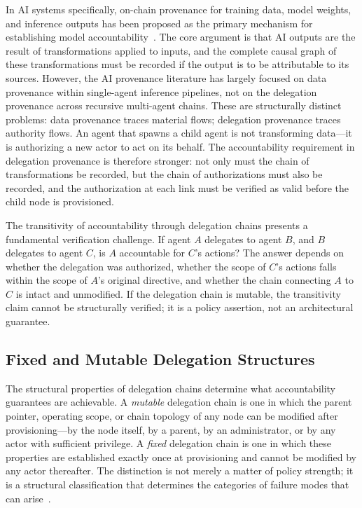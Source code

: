 In AI systems specifically, on-chain provenance for training data, model weights, and inference outputs has been proposed as the primary mechanism for establishing model accountability~\cite{ accountable_ai_dag}. The core argument is that AI outputs are the result of transformations applied to inputs, and the complete causal graph of these transformations must be recorded if the output is to be attributable to its sources. However, the AI provenance literature has largely focused on data provenance within single-agent inference pipelines, not on the delegation provenance across recursive multi-agent chains. These are structurally distinct problems: data provenance traces material flows; delegation provenance traces authority flows. An agent that spawns a child agent is not transforming data---it is authorizing a new actor to act on its behalf. The accountability requirement in delegation provenance is therefore stronger: not only must the chain of transformations be recorded, but the chain of authorizations must also be recorded, and the authorization at each link must be verified as valid before the child node is provisioned.

The transitivity of accountability through delegation chains presents a fundamental verification challenge. If agent $A$ delegates to agent $B$, and $B$ delegates to agent $C$, is $A$ accountable for $C$'s actions? The answer depends on whether the delegation was authorized, whether the scope of $C$'s actions falls within the scope of $A$'s original directive, and whether the chain connecting $A$ to $C$ is intact and unmodified. If the delegation chain is mutable, the transitivity claim cannot be structurally verified; it is a policy assertion, not an architectural guarantee.

\subsection{Fixed and Mutable Delegation Structures}
\label{sec:rs-delegation}

The structural properties of delegation chains determine what accountability guarantees are achievable. A \textit{mutable} delegation chain is one in which the parent pointer, operating scope, or chain topology of any node can be modified after provisioning---by the node itself, by a parent, by an administrator, or by any actor with sufficient privilege. A \textit{fixed} delegation chain is one in which these properties are established exactly once at provisioning and cannot be modified by any actor thereafter. The distinction is not merely a matter of policy strength; it is a structural classification that determines the categories of failure modes that can arise~\cite{bx3_framework_2026}.

